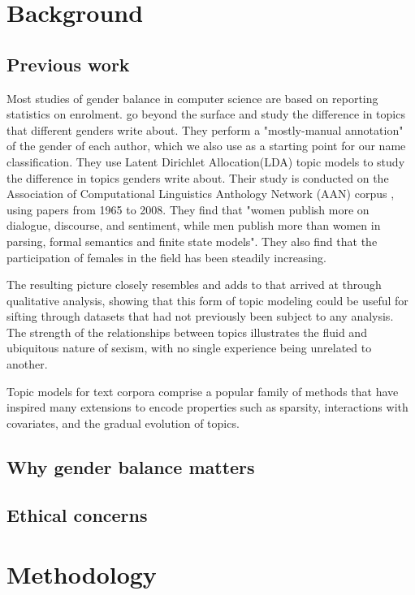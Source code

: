 \documentclass[bsc,frontabs,twoside,singlespacing,parskip,deptreport]{infthesis}     %
\begin{document}
\chapter{Background}

\section{Previous work}

Most studies of gender balance in computer science are based on reporting statistics on enrolment. \cite{Jurafsky_Hesaid} go beyond the surface and study the difference in topics that different genders write about. They perform a "mostly-manual annotation" of the gender of each author, which we also use as a starting point for our name classification. They use Latent Dirichlet Allocation(LDA) topic models \citep{Blei_LDA} to study the difference in topics genders write about. Their study is conducted on the Association of Computational Linguistics Anthology Network (AAN) corpus \citep{aan}, using papers from 1965 to 2008. They find that "women publish more on dialogue, discourse, and sentiment, while men publish more than women in parsing, formal semantics and finite state models". They also find that the participation of females in the field has been steadily increasing.

 The resulting picture closely resembles and adds to that arrived at through qualitative analysis, showing that this form of topic modeling could be useful for sifting through datasets that had not previously been subject to any analysis. The strength of the relationships between topics illustrates the fluid and ubiquitous nature of sexism, with no single experience being unrelated to another.

Topic models for text corpora comprise a popular family of methods that have inspired many extensions to encode properties such as sparsity, interactions with covariates, and the gradual evolution of topics.

\section{Why gender balance matters}

\section{Ethical concerns}

\chapter{Methodology}
\end{document}
